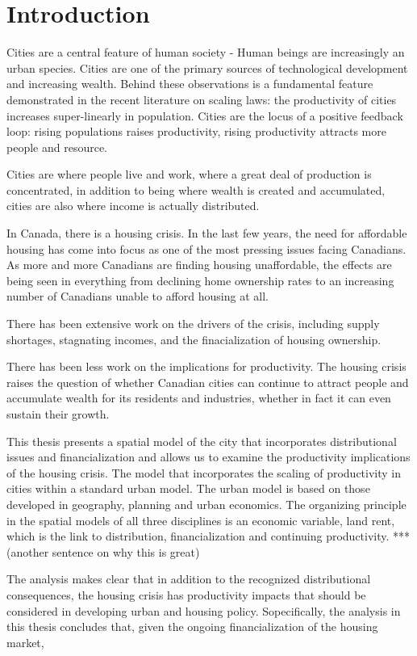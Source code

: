 \chapter{Introduction}

Cities are a central feature of human society - Human beings are increasingly an urban species. Cities are one of the primary sources of technological development and increasing wealth. Behind these observations is a fundamental feature demonstrated in the recent literature on scaling laws: the productivity of cities increases super-linearly in population. Cities are the locus of a positive feedback loop: rising populations raises productivity, rising productivity attracts more people and resource.

Cities are where people live and work, where a great deal of production is concentrated, in addition to being where wealth is created and accumulated, cities are also where income is actually distributed. 

In Canada, there is a housing crisis. In the last few years, the need for affordable housing has come into focus as one of the most pressing issues facing Canadians. As more and more Canadians are finding housing unaffordable, the effects are being seen in everything from declining home ownership rates to an increasing number of Canadians unable to afford housing at all.

There has been extensive work on the drivers of the crisis, including supply shortages, stagnating incomes, and the finacialization of housing ownership.

There has been less work on the implications for productivity. The housing crisis raises the question of whether Canadian cities can continue to attract people and accumulate wealth for its residents and industries, whether in fact it can even sustain their growth.

This thesis presents a spatial model of the city that incorporates distributional issues and financialization and allows us to examine the productivity implications of the housing crisis. The model that incorporates the scaling of productivity in cities within a standard urban model. 
The urban model is based on those developed in geography, planning and urban economics. The organizing principle in  the spatial models of all three disciplines is an economic variable, land rent, which is the link to distribution, financialization and continuing productivity. *** (another sentence on why this is great)

The analysis makes clear that in addition to the recognized distributional consequences, the housing crisis has productivity impacts that should be considered in developing urban and housing policy. Sopecifically, the analysis in this thesis concludes that, given the ongoing financialization of the housing market,



